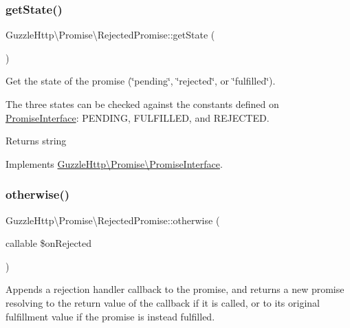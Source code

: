 \subsubsection{\texorpdfstring{get\+State()}{getState()}}
{\footnotesize\ttfamily Guzzle\+Http\textbackslash{}\+Promise\textbackslash{}\+Rejected\+Promise\+::get\+State (\begin{DoxyParamCaption}{ }\end{DoxyParamCaption})}

Get the state of the promise (\char`\"{}pending\char`\"{}, \char`\"{}rejected\char`\"{}, or \char`\"{}fulfilled\char`\"{}).

The three states can be checked against the constants defined on \hyperlink{interfaceGuzzleHttp_1_1Promise_1_1PromiseInterface}{Promise\+Interface}\+: P\+E\+N\+D\+I\+NG, F\+U\+L\+F\+I\+L\+L\+ED, and R\+E\+J\+E\+C\+T\+ED.

\begin{DoxyReturn}{Returns}
string 
\end{DoxyReturn}


Implements \hyperlink{interfaceGuzzleHttp_1_1Promise_1_1PromiseInterface_a4473485faedc0b6489ff28b4fbdc2330}{Guzzle\+Http\textbackslash{}\+Promise\textbackslash{}\+Promise\+Interface}.

\mbox{\label{classGuzzleHttp_1_1Promise_1_1RejectedPromise_a83b4819e3244c3f0ee82c636b54bb99c}} 
\subsubsection{\texorpdfstring{otherwise()}{otherwise()}}
{\footnotesize\ttfamily Guzzle\+Http\textbackslash{}\+Promise\textbackslash{}\+Rejected\+Promise\+::otherwise (\begin{DoxyParamCaption}\item[{callable}]{\$on\+Rejected }\end{DoxyParamCaption})}

Appends a rejection handler callback to the promise, and returns a new promise resolving to the return value of the callback if it is called, or to its original fulfillment value if the promise is instead fulfilled.


